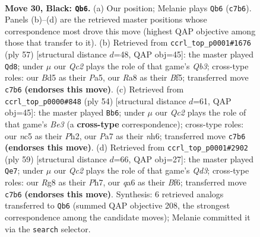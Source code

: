 \documentclass[11pt]{article}
\begin{document}
\clearpage

\begin{figure}[p]\centering
\begin{subfigure}{0.46\textwidth}\centering
\resizebox{\linewidth}{!}{%
\newchessgame
\chessboard[
  setfen={r2k2r1/p1q2p1p/Q1p5/2Nb4/8/3P2P1/5P1P/2R3K1 b - - 0 30},
  showmover=false,
  pgfstyle=straightmove, color=movearrow, markmove={c7-b6}
]}
\caption{}
\end{subfigure}\hfill
\begin{subfigure}{0.46\textwidth}\centering
\resizebox{\linewidth}{!}{%
\newchessgame
\chessboard[
  setfen={1r4k1/4Q1pp/1q3p2/pp3b2/8/P4N1P/3P1PP1/2R3K1 b - - 8 29},
  showmover=false,
  pgfstyle=straightmove, color=movearrow, markmove={b6-d8}
]}
\caption{}
\end{subfigure}
\\[4pt]
\begin{subfigure}{0.46\textwidth}\centering
\resizebox{\linewidth}{!}{%
\newchessgame
\chessboard[
  setfen={2r3k1/5ppp/4p2n/P7/1q3P2/4B2Q/6PP/3R3K w - - 2 28},
  showmover=false,
  pgfstyle=straightmove, color=movearrow, markmove={e3-b6}
]}
\caption{}
\end{subfigure}\hfill
\begin{subfigure}{0.46\textwidth}\centering
\resizebox{\linewidth}{!}{%
\newchessgame
\chessboard[
  setfen={3r2k1/1p4pp/p2q1b2/3p4/1P5P/P4NP1/4QP2/3R2K1 b - - 0 30},
  showmover=false,
  pgfstyle=straightmove, color=movearrow, markmove={d6-e7}
]}
\caption{}
\end{subfigure}
\caption{\textbf{Move 30, Black: \texttt{Qb6}.} (a) Our position; Melanie plays \texttt{Qb6} (\texttt{c7b6}). Panels (b)--(d) are the retrieved master positions whose correspondence most drove this move (highest QAP objective among those that transfer to it). (b) Retrieved from \texttt{ccrl\_top\_p0001\#1676} (ply 57) [structural distance $d$=48, QAP obj=45]: the master played \texttt{Qd8}; under $\mu$ our \emph{Qc2} plays the role of that game's \emph{Qb3}; cross-type roles: our \emph{B}d5 as their \emph{P}a5, our \emph{R}a8 as their \emph{B}f5; transferred move \texttt{c7b6} \textbf{(endorses this move)}. (c) Retrieved from \texttt{ccrl\_top\_p0000\#848} (ply 54) [structural distance $d$=61, QAP obj=45]: the master played \texttt{Bb6}; under $\mu$ our \emph{Qc2} plays the role of that game's \emph{Be3} (a \textbf{cross-type} correspondence); cross-type roles: our \emph{n}c5 as their \emph{P}h2, our \emph{P}a7 as their \emph{n}h6; transferred move \texttt{c7b6} \textbf{(endorses this move)}. (d) Retrieved from \texttt{ccrl\_top\_p0001\#2902} (ply 59) [structural distance $d$=66, QAP obj=27]: the master played \texttt{Qe7}; under $\mu$ our \emph{Qc2} plays the role of that game's \emph{Qd3}; cross-type roles: our \emph{R}g8 as their \emph{P}h7, our \emph{q}a6 as their \emph{B}f6; transferred move \texttt{c7b6} \textbf{(endorses this move)}. Synthesis: 6 retrieved analogs transferred to \texttt{Qb6} (summed QAP objective 208, the strongest correspondence among the candidate moves); Melanie committed it via the \texttt{search} selector.}
\label{fig:thought-m59}
\end{figure}
\end{document}

